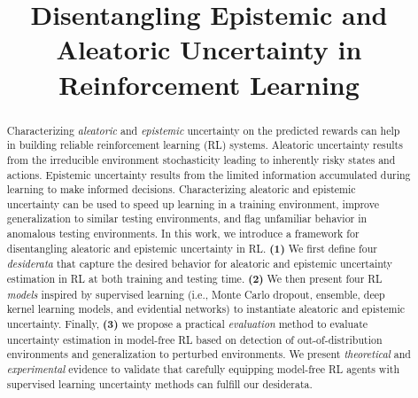 \documentclass{article}
\title{Disentangling Epistemic and Aleatoric Uncertainty in Reinforcement Learning}
\author{%
}
\begin{document}
\maketitle

\begin{abstract}
    
    Characterizing \emph{aleatoric} and \emph{epistemic} uncertainty on the predicted rewards can help in building reliable reinforcement learning (RL) systems. Aleatoric uncertainty results from the irreducible environment stochasticity leading to inherently risky states and actions. Epistemic uncertainty results from the limited information accumulated during learning to make informed decisions. Characterizing aleatoric and epistemic uncertainty can be used to speed up learning in a training environment, improve generalization to similar testing environments, and flag unfamiliar behavior in anomalous testing environments. In this work, we introduce a framework for disentangling aleatoric and epistemic uncertainty in RL. \textbf{(1)} We first define four \emph{desiderata} that capture the desired behavior for aleatoric and epistemic uncertainty estimation in RL at both training and testing time. \textbf{(2)} We then present four RL \emph{models} inspired by supervised learning (i.e., Monte Carlo dropout, ensemble, deep kernel learning models, and evidential networks) to instantiate aleatoric and epistemic uncertainty. Finally, \textbf{(3)} we propose a practical \emph{evaluation} method to evaluate uncertainty estimation in model-free RL based on detection of out-of-distribution environments and generalization to perturbed environments. We present \emph{theoretical} and \emph{experimental} evidence to validate that carefully equipping model-free RL agents with supervised learning uncertainty methods can fulfill our desiderata.
    
\end{abstract}










\printbibliography

\newpage

%

\newpage


\appendix

\end{document}
